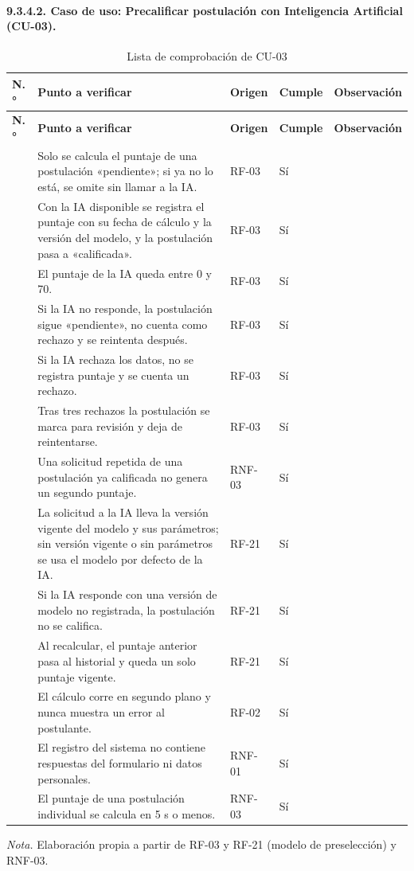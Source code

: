 \paragraph{9.3.4.2. Caso de uso: Precalificar postulación con Inteligencia Artificial (CU-03).}

\begingroup\footnotesize
\begin{longtable}{@{}>{\raggedright\arraybackslash}p{0.7cm}>{\raggedright\arraybackslash}p{7.6cm}>{\raggedright\arraybackslash}p{2.0cm}>{\raggedright\arraybackslash}p{1.2cm}>{\raggedright\arraybackslash}p{2.3cm}@{}}
\caption{Lista de comprobación de CU-03}\label{tab:lc_cu03}\\
\toprule
\textbf{N.°} & \textbf{Punto a verificar} & \textbf{Origen} & \textbf{Cumple} & \textbf{Observación} \\
\midrule
\endfirsthead
\toprule
\textbf{N.°} & \textbf{Punto a verificar} & \textbf{Origen} & \textbf{Cumple} & \textbf{Observación} \\
\midrule
\endhead
\bottomrule
\endfoot
1 & Solo se calcula el puntaje de una postulación «pendiente»; si ya no lo está, se omite sin llamar a la IA. & RF-03 & Sí & \\
2 & Con la IA disponible se registra el puntaje con su fecha de cálculo y la versión del modelo, y la postulación pasa a «calificada». & RF-03 & Sí & \\
3 & El puntaje de la IA queda entre 0 y 70. & RF-03 & Sí & \\
4 & Si la IA no responde, la postulación sigue «pendiente», no cuenta como rechazo y se reintenta después. & RF-03 & Sí & \\
5 & Si la IA rechaza los datos, no se registra puntaje y se cuenta un rechazo. & RF-03 & Sí & \\
6 & Tras tres rechazos la postulación se marca para revisión y deja de reintentarse. & RF-03 & Sí & \\
7 & Una solicitud repetida de una postulación ya calificada no genera un segundo puntaje. & RNF-03 & Sí & \\
8 & La solicitud a la IA lleva la versión vigente del modelo y sus parámetros; sin versión vigente o sin parámetros se usa el modelo por defecto de la IA. & RF-21 & Sí & \\
9 & Si la IA responde con una versión de modelo no registrada, la postulación no se califica. & RF-21 & Sí & \\
10 & Al recalcular, el puntaje anterior pasa al historial y queda un solo puntaje vigente. & RF-21 & Sí & \\
11 & El cálculo corre en segundo plano y nunca muestra un error al postulante. & RF-02 & Sí & \\
12 & El registro del sistema no contiene respuestas del formulario ni datos personales. & RNF-01 & Sí & \\
13 & El puntaje de una postulación individual se calcula en 5 s o menos. & RNF-03 & Sí & \\
\end{longtable}
\endgroup
\noindent\textit{Nota.} Elaboración propia a partir de RF-03 y RF-21 (modelo de preselección) y RNF-03.

